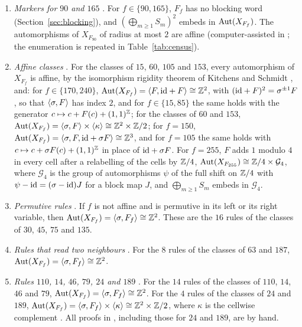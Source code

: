 \begin{enumerate}
\item\label{imp:90} \emph{Markers for $90$ and $165$} \cite{PaperC}. For $f\in\{90,165\}$, $F_f$ has no blocking word (Section~\ref{sec:blocking}), and $(\bigoplus_{m\ge1}S_m)^2$ embeds in $\operatorname{Aut}(X_{F_f})$. The automorphisms of $X_{F_{90}}$ of radius at most $2$ are affine (computer-assisted in \cite{PaperC}; the enumeration is repeated in Table~\ref{tab:census}).
\item\label{imp:affine} \emph{Affine classes} \cite{PaperC}. For the classes of $15$, $60$, $105$ and $153$, every automorphism of $X_{F_f}$ is affine, by the isomorphism rigidity theorem of Kitchens and Schmidt \cite{KS2000}, and: for $f\in\{170,240\}$, $\operatorname{Aut}(X_{F_f})=\langle F,\mathrm{id}+F\rangle\cong\mathbb{Z}^2$, with $(\mathrm{id}+F)^2=\sigma^{\pm1}F$, so that $\langle\sigma,F\rangle$ has index $2$, and for $f\in\{15,85\}$ the same holds with the generator $c\mapsto c+F(c)+(1,1)^{\mathbb{Z}}$; for the classes of $60$ and $153$, $\operatorname{Aut}(X_{F_f})=\langle\sigma,F\rangle\times\langle\kappa\rangle\cong\mathbb{Z}^2\times\mathbb{Z}/2$; for $f=150$, $\operatorname{Aut}(X_{F_f})=\langle\sigma,F,\mathrm{id}+\sigma F\rangle\cong\mathbb{Z}^3$, and for $f=105$ the same holds with $c\mapsto c+\sigma F(c)+(1,1)^{\mathbb{Z}}$ in place of $\mathrm{id}+\sigma F$. For $f=255$, $F$ adds $1$ modulo $4$ in every cell after a relabelling of the cells by $\mathbb{Z}/4$, $\operatorname{Aut}(X_{F_{255}})\cong\mathbb{Z}/4\times\mathcal G_4$, where $\mathcal G_4$ is the group of automorphisms $\psi$ of the full shift on $\mathbb{Z}/4$ with $\psi-\mathrm{id}=(\sigma-\mathrm{id})J$ for a block map $J$, and $\bigoplus_{m\ge1}S_m$ embeds in $\mathcal G_4$.
\item\label{imp:perm} \emph{Permutive rules} \cite{PaperB}. If $f$ is not affine and is permutive in its left or its right variable, then $\operatorname{Aut}(X_{F_f})=\langle\sigma,F_f\rangle\cong\mathbb{Z}^2$. These are the $16$ rules of the classes of $30$, $45$, $75$ and $135$.
\item\label{imp:half} \emph{Rules that read two neighbours} \cite{PaperB}. For the $8$ rules of the classes of $63$ and $187$, $\operatorname{Aut}(X_{F_f})=\langle\sigma,F_f\rangle\cong\mathbb{Z}^2$.
\item\label{imp:110} \emph{Rules $110$, $14$, $46$, $79$, $24$ and $189$} \cite{PaperA}. For the $14$ rules of the classes of $110$, $14$, $46$ and $79$, $\operatorname{Aut}(X_{F_f})=\langle\sigma,F_f\rangle\cong\mathbb{Z}^2$. For the $4$ rules of the classes of $24$ and $189$, $\operatorname{Aut}(X_{F_f})=\langle\sigma,F_f\rangle\times\langle\kappa\rangle\cong\mathbb{Z}^2\times\mathbb{Z}/2$, where $\kappa$ is the cellwise complement \cite[Theorem~1.1]{PaperA}. All proofs in \cite{PaperA}, including those for $24$ and $189$, are by hand.

\end{enumerate}

